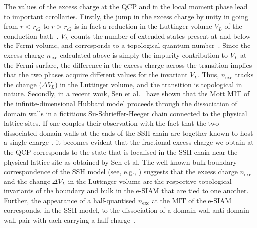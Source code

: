 \documentclass{iopart}
\begin{document}
The values of the excess charge at the QCP and in the local moment phase lead to important corollaries. Firstly, the jump in the excess charge by unity in going from \(r < r_{c2}\) to \(r > r_{c2}\) is in fact a reduction in the Luttinger volume \(V_L\) of the conduction bath~\cite{luttinger1960fermi,martin1982fermi}. \(V_L\) counts the number of extended states present at and below the Fermi volume, and corresponds to a  topological quantum number~\cite{oshikawa2000topological,seki2017topological,Heath2020,anirbanurg1}. Since the excess charge \(n_\text{exc}\) calculated above is simply the impurity contribution to \(V_L\) at the Fermi surface, the difference in the excess charge across the transition implies that the two phases acquire different values for the invariant \(V_L\). Thus, $n_\text{exc}$ tracks the change ($\Delta V_{L}$) in the Luttinger volume, and the transition is topological in nature. Secondly, in a recent work, Sen et al.~\cite{sen_mitchell_2020} have shown that the Mott MIT of the infinite-dimensional Hubbard model proceeds through the dissociation of domain walls in a fictitious Su-Schrieffer-Heeger chain connected to the physical lattice sites. If one couples their observation with the fact that the two dissociated domain walls at the ends of the SSH chain are together known to host a single charge~\cite{SSHRMP1988,stone_1985}, it becomes evident that the fractional excess charge we obtain at the QCP corresponds to the state that is localised in the SSH chain near the physical lattice site as obtained by Sen et al. The well-known bulk-boundary correspondence of the SSH model (see, e.g., \cite{Asboth_2016}) suggests that the excess charge $n_\text{exc}$ and the change $\Delta V_{L}$ in the Luttinger volume are the respective topological invariants of the boundary and bulk in the e-SIAM that are tied to one another. Further, the appearance of a half-quantised $n_\text{exc}$ at the MIT of the e-SIAM corresponds, in the SSH model, to the dissociation of a domain wall-anti domain wall pair with each carrying a half charge~\cite{SSHRMP1988,stone_1985}.
\end{document}
